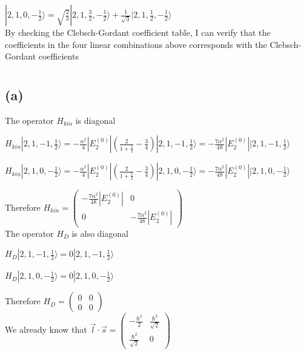 \documentclass[12pt]{article}
\begin{document}
\begin{spacing}{2.0}
$|2,1,0,-\frac{1}{2} \rangle= \sqrt{\frac{2}{3}} |2,1,\frac{3}{2}, -\frac{1}{2} \rangle +   \frac{1}{\sqrt{3}} |2,1,\frac{1}{2}, -\frac{1}{2} \rangle$\\


By checking the Clebsch-Gordant coefficient table, I can verify that the coefficients in the four linear combinations above corresponds with the Clebsch-Gordant coefficients

\section{} %

\subsection*{(a)}

The operator $H_{kin}$ is diagonal

$H_{kin}|2,1,-1,\frac{1}{2}\rangle = -\frac{\alpha^2}{4} |E_2^{(0)}| \left(\frac{2}{1+\frac{1}{2}}-\frac{3}{4} \right) |2,1,-1,\frac{1}{2}\rangle = -\frac{7\alpha^2}{48} |E_2^{(0)}| |2,1,-1,\frac{1}{2}\rangle$

$H_{kin}|2,1,0,-\frac{1}{2}\rangle= -\frac{\alpha^2}{4} |E_2^{(0)}| \left(\frac{2}{1+\frac{1}{2}}-\frac{3}{4} \right) |2,1,0,-\frac{1}{2}\rangle = -\frac{7\alpha^2}{48} |E_2^{(0)}| |2,1,0,-\frac{1}{2}\rangle$

Therefore $H_{kin}= \left(
\begin{array}{cc}
-\frac{7\alpha^2}{48} |E_2^{(0)}| & 0 \\
0 & -\frac{7\alpha^2}{48} |E_2^{(0)}|
\end{array}
\right)
$\\

The operator $H_D$ is also diagonal

$H_{D}|2,1,-1,\frac{1}{2}\rangle = 0 |2,1,-1,\frac{1}{2}\rangle$

$H_{D}|2,1,0,-\frac{1}{2}\rangle = 0 |2,1,0,-\frac{1}{2}\rangle$

Therefore $H_{D}= \left(
\begin{array}{cc}
0 & 0 \\
0 & 0
\end{array}
\right)
$\\

We already know that $\vec{l} \cdot \vec{s}= \left(
\begin{array}{cc}
-\frac{\hbar^2}{2} & \frac{\hbar^2}{\sqrt{2}}\\
\frac{\hbar^2}{\sqrt{2}} & 0
\end{array}
\right)$


\end{spacing}
\end{document}
